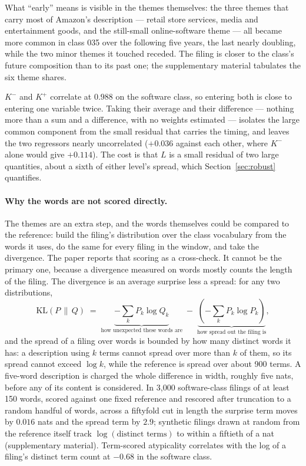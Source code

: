 What ``early'' means is visible in the themes themselves: the three themes
that carry most of Amazon's description --- retail store services, media
and entertainment goods, and the still-small online-software theme --- all
became more common in class 035 over the following five years, the last
nearly doubling, while the two minor themes it touched receded. The filing
is closer to the class's future composition than to its past one; the
supplementary material tabulates the six theme shares.

$K^{-}$ and $K^{+}$
correlate at $0.988$ on the software class, so entering both is close to
entering one variable twice. Taking their average and their difference ---
nothing more than a sum and a difference, with no weights estimated ---
isolates the large common component from the small residual that carries
the timing, and leaves the two regressors nearly uncorrelated ($+0.036$ against
each other, where $K^{-}$ alone would give $+0.114$). The cost is that $L$ is
a small residual of two large quantities, about a sixth of either level's
spread, which Section~\ref{sec:robust} quantifies.


\paragraph{Why the words are not scored directly.} The themes are an extra
step, and the words themselves could be compared to the reference: build the
filing's distribution over the class vocabulary from the words it uses, do
the same for every filing in the window, and take the divergence. The paper
reports that scoring as a cross-check. It cannot be the primary one, because
a divergence measured on words mostly counts the length of the filing. The
divergence is an average surprise less a spread: for any two distributions,
\[
  \mathrm{KL}(P \,\|\, Q) \;=\; \underbrace{-\textstyle\sum_k P_k \log Q_k}_{\text{how unexpected these words are}}
  \;-\; \underbrace{\left(-\textstyle\sum_k P_k \log P_k\right)}_{\text{how spread out the filing is}} ,
\]
and the spread of a filing over words is bounded by how many distinct words it
has: a description using $k$ terms cannot spread over more than $k$ of them,
so its spread cannot exceed $\log k$, while the reference is spread over about
900 terms. A five-word description is charged the whole difference in width,
roughly five nats, before any of its content is considered. In 3{,}000
software-class filings of at least 150 words, scored against one fixed
reference and rescored after truncation to a random handful of words,
across a fiftyfold cut in length
the surprise term moves by $0.016$ nats and the spread term by $2.9$; synthetic filings drawn at random from the
reference itself track $\log(\text{distinct terms})$ to within a fiftieth
of a nat (supplementary material). Term-scored atypicality correlates with
the log of a filing's distinct term count at $-0.68$ in the software
class.


